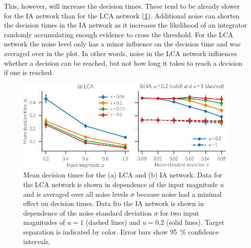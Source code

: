 This, however, will increase the decision times.
These tend to be already slower for the IA network than for the LCA network (\cref{fig:ia-time}).
Additional noise can shorten the decision times in the IA network as it increases the likelihood of an integrator randomly accumulating enough evidence to cross the threshold.
For the LCA network the noise level only has a minor influence on the decision time and was averaged over in the plot.
In other words, noise in the LCA network influences whether a decision can be reached, but not how long it takes to reach a decision if one is reached.
\begin{figure}
    \centering
    \includegraphics{figures/ia-time}
    \caption[Mean WTA decisions times]{Mean decision times for the (a) LCA and (b) IA network. Data for the LCA network is shown in dependence of the input magnitude $u$ and is averaged over all noise levels $\sigma$ because noise had a minimal effect on decision times. Data fro the IA network is shown in dependence of the noise standard deviation $\sigma$ for two input magnitudes of $u = 1$ (dashed lines) and $u = 0.2$ (solid lines). Target separation is indicated by color. Error bars show \SI{95}{\percent} confidence intervals.}\label{fig:ia-time}
\end{figure}

